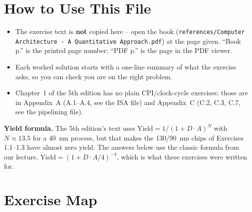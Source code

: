 \documentclass[11pt]{article}
\begin{document}
\sloppy
{}

\section{How to Use This File}

\begin{itemize}[leftmargin=*]
  \item The exercise text is \textbf{not} copied here -- open the book
  (\texttt{references/Computer Architecture - A Quantitative Approach.pdf})
  at the page given. ``Book p.'' is the printed page number; ``PDF p.'' is
  the page in the PDF viewer.
  \item Each worked solution starts with a one-line summary of what the
  exercise asks, so you can check you are on the right problem.
  \item Chapter~1 of the 5th edition has no plain CPI/clock-cycle
  exercises; those are in Appendix~A (A.1--A.4, see the ISA file) and
  Appendix~C (C.2, C.3, C.7, see the pipelining file).
\end{itemize}

\begin{note}
\textbf{Yield formula.} The 5th edition's text uses
$\text{Yield}=1/(1+D\cdot A)^N$ with $N\approx13.5$ for a 40~nm process, but
that makes the 130/90~nm chips of Exercises 1.1--1.3 have almost zero yield.
The answers below use the classic formula from our lecture,
$\text{Yield}=(1+D\cdot A/4)^{-4}$, which is what these exercises were
written for.
\end{note}

\section{Exercise Map}
\end{document}
